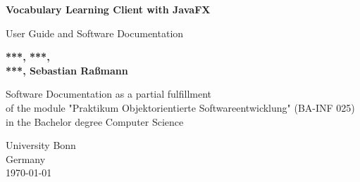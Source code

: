 \begin{titlepage}

    \begin{center}
        \vspace*{1cm}
            
        \Huge
        \textbf{Vocabulary Learning Client with JavaFX}
            
        \vspace{0.5cm}
        \LARGE
        User Guide and Software Documentation
            
        \vspace{1.5cm}
            
        \textbf{***, ***,\\***, Sebastian Raßmann}
            
        \vfill
            
        Software Documentation as a partial fulfillment
    \\ of the module "Praktikum Objektorientierte Softwareentwicklung" (BA-INF 025) \\
    in the Bachelor degree Computer Science
            
        \vspace{3cm}
        
        \Large
        University Bonn\\
        Germany\\
        \today
            
            
    \end{center}
\end{titlepage}